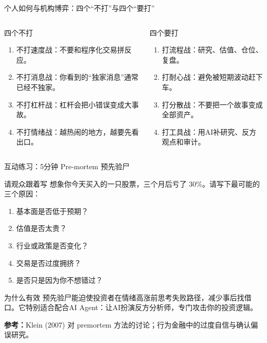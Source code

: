 \documentclass[UTF8,aspectratio=169,11pt]{ctexbeamer}
\newcommand{\source}[1]{\vfill{\scriptsize\color{aqgray}\textbf{参考：}#1}}
\begin{document}
\begin{frame}{个人如何与机构博弈：四个“不打”与四个“要打”}
\begin{columns}[T,totalwidth=\textwidth]
\begin{riskbox}{四个不打}
\small
\begin{enumerate}
\item 不打速度战：不要和程序化交易拼反应。
\item 不打消息战：你看到的“独家消息”通常已经不独家。
\item 不打杠杆战：杠杆会把小错误变成大事故。
\item 不打情绪战：越热闹的地方，越要先看出口。
\end{enumerate}
\end{riskbox}
\begin{greenbox}{四个要打}
\small
\begin{enumerate}
\item 打流程战：研究、估值、仓位、复盘。
\item 打耐心战：避免被短期波动赶下车。
\item 打分散战：不要把一个故事变成全部资产。
\item 打工具战：用AI补研究、反方观点和审计。
\end{enumerate}
\end{greenbox}
\end{columns}
\end{frame}
\begin{frame}{互动练习：5分钟 Pre-mortem 预先验尸}
\begin{casebox}{请观众跟着写}
\small
想象你今天买入的一只股票，三个月后亏了 30\%。请写下最可能的三个原因：
\begin{enumerate}
\item 基本面是否低于预期？
\item 估值是否太贵？
\item 行业或政策是否变化？
\item 交易是否过度拥挤？
\item 是否只是因为你不想错过？
\end{enumerate}
\end{casebox}
\vspace{0.25cm}
\begin{greenbox}{为什么有效}
\small
预先验尸能迫使投资者在情绪高涨前思考失败路径，减少事后找借口。它特别适合配合AI Agent：让AI扮演反方分析师，专门攻击你的投资逻辑。
\end{greenbox}
\source{Klein (2007) 对 premortem 方法的讨论；行为金融中的过度自信与确认偏误研究。}
\end{frame}
\end{document}
